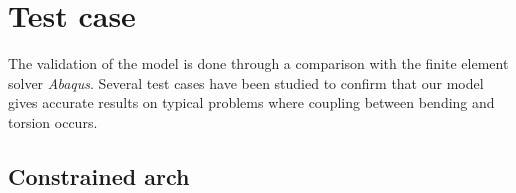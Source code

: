 





\clearpage
\section{Test case}\label{sec=testcase}

The validation of the model is done through a comparison with the finite element solver \emph{Abaqus}. Several test cases have been studied to confirm that our model gives accurate results on typical problems where coupling between bending and torsion occurs.

\subsection{Constrained arch}\label{sec=testcase}


